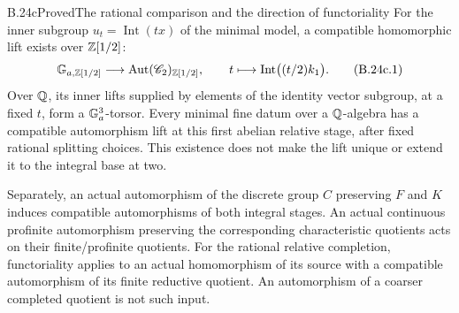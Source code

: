 \begin{statement}{B.24c}{Proved}{The rational comparison and the direction of functoriality}
For the inner subgroup $u_t=\operatorname{Int}(t x)$ of the minimal
model, a compatible homomorphic lift exists over $\mathbb Z[1/2]$:
\[
 \mathbb G_{a,\mathbb Z[1/2]}\longrightarrow\operatorname{Aut}(\mathscr C_2)_{\mathbb Z[1/2]},
 \qquad t\longmapsto\operatorname{Int}\bigl((t/2)k_1\bigr).
 \tag{B.24c.1}
\]
Over $\mathbb Q$, its inner lifts supplied by elements of the identity vector
subgroup, at a fixed $t$, form a $\mathbb G_a^3$-torsor.
Every minimal fine datum over a $\mathbb Q$-algebra has a compatible
automorphism lift at this first abelian relative stage, after fixed
rational splitting choices.  This existence does not make the lift
unique or extend it to the integral base at two.

Separately, an actual automorphism of the discrete group $C$
preserving $F$ and $K$ induces compatible automorphisms of both
integral stages.  An actual continuous profinite automorphism preserving
the corresponding characteristic quotients acts on their finite/profinite
quotients.  For the rational relative completion, functoriality applies
to an actual homomorphism of its source with a compatible automorphism
of its finite reductive quotient.  An automorphism of a coarser completed
quotient is not such input.
\end{statement}
